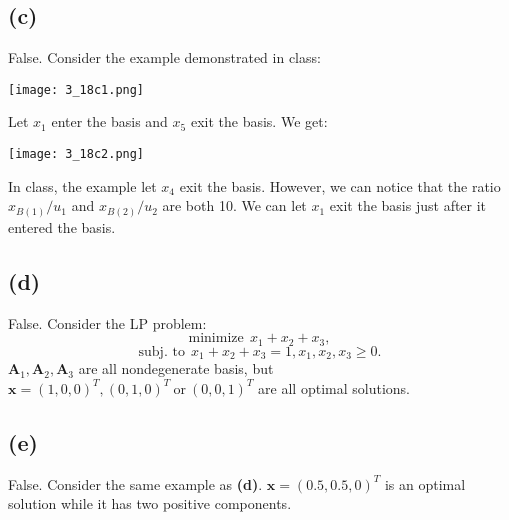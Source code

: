 \documentclass[12pt]{article}
\begin{document}
\subsection*{(c)}
False. Consider the example demonstrated in class:

\centerline{\texttt{[image: 3\_18c1.png]}}

Let $x_1$ enter the basis and $x_5$ exit the basis. We get:

\centerline{\texttt{[image: 3\_18c2.png]}}

In class, the example let $x_4$ exit the basis. However, we can notice that the ratio $x_{B(1)}/u_1$ and $x_{B(2)}/u_2$ are both 10. We can let $x_1$ exit the basis just after it entered the basis.

\subsection*{(d)}
False. Consider the LP problem: $$\text{minimize}\ \ x_1+x_2+x_3,$$ $$\text{subj. to}\ \ x_1+x_2+x_3=1, x_1,x_2,x_3\ge 0.$$
$\bm{A}_1,\bm{A}_2,\bm{A}_3$ are all nondegenerate basis, but $\bm{x}=(1,0,0)^T,(0,1,0)^T\ \text{or}\ (0,0,1)^T$ are all optimal solutions.

\subsection*{(e)}
False. Consider the same example as \textbf{(d)}. $\bm{x}=(0.5, 0.5, 0)^T$ is an optimal solution while it has two positive components.
\end{document}
